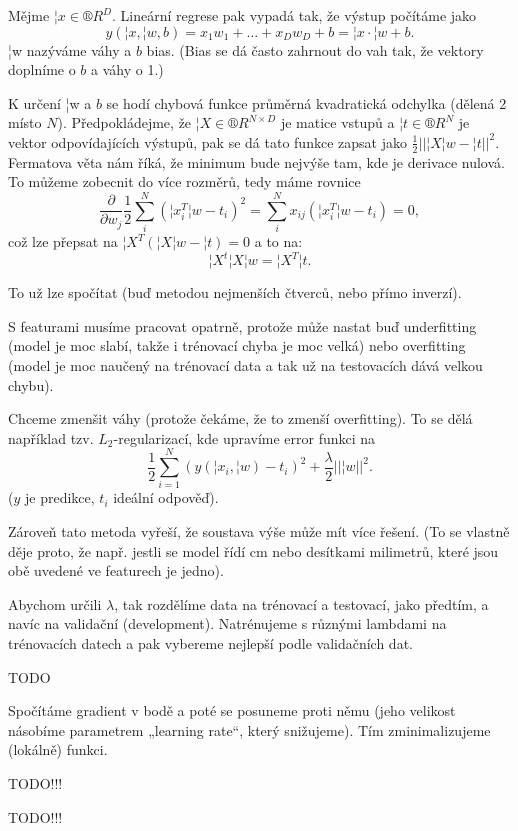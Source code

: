 \documentclass[12pt]{article}					%
\begin{document}
\begin{definice}
	Mějme $¦x \in ®R^D$. Lineární regrese pak vypadá tak, že výstup počítáme jako
	$$ y\left(¦x, ¦w, b\right) = x_1w_1 + … + x_Dw_D + b = ¦x·¦w + b. $$
	¦w nazýváme váhy a $b$ bias. (Bias se dá často zahrnout do vah tak, že vektory doplníme o $b$ a váhy o 1.)

	K určení ¦w a $b$ se hodí chybová funkce průměrná kvadratická odchylka (dělená 2 místo $N$). Předpokládejme, že $¦X \in ®R^{N\times D}$ je matice vstupů a $¦t \in ®R^N$ je vektor odpovídajících výstupů, pak se dá tato funkce zapsat jako $\frac{1}{2}||¦X¦w - ¦t||^2$. Fermatova věta nám říká, že minimum bude nejvýše tam, kde je derivace nulová. To můžeme zobecnit do více rozměrů, tedy máme rovnice
	$$ \frac{\partial}{\partial w_j}\frac{1}{2} \sum_i^N\left(¦x_i^T¦w - t_i\right)^2 = \sum_i^N x_{ij}\left(¦x_i^T¦w - t_i\right) = 0, $$
	což lze přepsat na $¦X^T\left(¦X¦w - ¦t\right) = 0 $ a to na:
	$$ ¦X^t¦X¦w = ¦X^T¦t. $$
	
	To už lze spočítat (buď metodou nejmenších čtverců, nebo přímo inverzí).
\end{definice}

\begin{poznamka}
	S featurami musíme pracovat opatrně, protože může nastat buď underfitting (model je moc slabí, takže i trénovací chyba je moc velká) nebo overfitting (model je moc naučený na trénovací data a tak už na testovacích dává velkou chybu).
\end{poznamka}


\begin{definice}[Regularizace]
	Chceme zmenšit váhy (protože čekáme, že to zmenší overfitting). To se dělá například tzv. $L_2$-regularizací, kde upravíme error funkci na
	$$ \frac{1}{2}\sum_{i=1}^N (y(¦x_i, ¦w) - t_i)^2 + \frac{\lambda}{2}||¦w||^2. $$
	($y$ je predikce, $t_i$ ideální odpověď).

	Zároveň tato metoda vyřeší, že soustava výše může mít více řešení. (To se vlastně děje proto, že např. jestli se model řídí cm nebo desítkami milimetrů, které jsou obě uvedené ve featurech je jedno).
\end{definice}

\begin{poznamka}
	Abychom určili $\lambda$, tak rozdělíme data na trénovací a testovací, jako předtím, a navíc na validační (development). Natrénujeme s různými lambdami na trénovacích datech a pak vybereme nejlepší podle validačních dat.
\end{poznamka}

TODO

\begin{definice}
	Spočítáme gradient v bodě a poté se posuneme proti němu (jeho velikost násobíme parametrem „learning rate“, který snižujeme). Tím zminimalizujeme (lokálně) funkci.
\end{definice}


TODO!!!


TODO!!!
\end{document}
